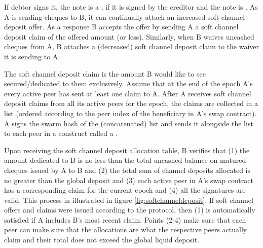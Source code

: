 If debtor signs it, the note is a , if it is signed by the creditor and the note is . As A is sending cheques to B, it can continually attach an increased soft channel deposit offer. As a response B accepts the offer by sending A a soft channel deposit claim of the offered amount (or less). Similarly, when B waives uncashed cheques from A, B attaches a (decreased) soft channel deposit claim to the waiver it is sending to A.

The soft channel deposit claim is the amount B would like to see secured/dedicated to them exclusively.
Assume that at the end of the epoch A's every  active peer has sent at least one claim to A.
After A receives soft channel deposit claims from all its active peers for the epoch, the claims are collected in a list (ordered according to the peer index of the beneficiary in A's swap contract). A signs the swarm hash of the (concatenated) list and sends it alongside the list to each peer
in a construct called a .

Upon receiving the soft channel deposit allocation table, B verifies that
(1) the amount dedicated to B is no less than the total uncashed balance on matured cheques issued by A to B and
(2) the total sum of channel deposits allocated is no greater than the global deposit and
(3) each active peer in A's swap contract has a corresponding claim for the current epoch and 
(4) all the signatures are valid.
This process in illustrated in figure \ref{fig:softchanneldeposit}.
If soft channel offers and claims were issued according to the protocol, then (1) is automatically satisfied if A includes B's most recent claim. Points (2-4) make sure that each peer can make sure that the allocations are what the respective peers actually claim and their total does not exceed the global liquid deposit.


